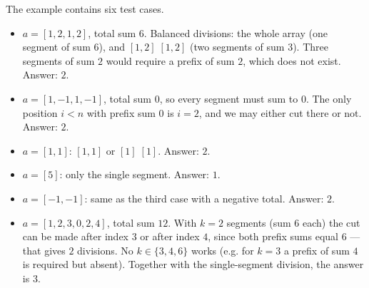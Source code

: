 The example contains six test cases.

\begin{itemize}
  \item $a = [1, 2, 1, 2]$, total sum $6$. Balanced divisions: the whole array (one segment of sum $6$), and $[1, 2]\;[1, 2]$ (two segments of sum $3$). Three segments of sum $2$ would require a prefix of sum $2$, which does not exist. Answer: $2$.
  \item $a = [1, -1, 1, -1]$, total sum $0$, so every segment must sum to $0$. The only position $i < n$ with prefix sum $0$ is $i = 2$, and we may either cut there or not. Answer: $2$.
  \item $a = [1, 1]$: $[1, 1]$ or $[1]\;[1]$. Answer: $2$.
  \item $a = [5]$: only the single segment. Answer: $1$.
  \item $a = [-1, -1]$: same as the third case with a negative total. Answer: $2$.
  \item $a = [1, 2, 3, 0, 2, 4]$, total sum $12$. With $k = 2$ segments (sum $6$ each) the cut can be made after index $3$ or after index $4$, since both prefix sums equal $6$ --- that gives $2$ divisions. No $k \in \{3, 4, 6\}$ works (e.g. for $k = 3$ a prefix of sum $4$ is required but absent). Together with the single-segment division, the answer is $3$.
\end{itemize}
